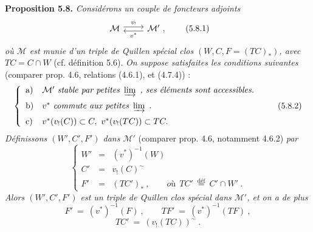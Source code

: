 \documentclass[11pt]{article}
\newcommand{\msp}[1]{\marginpar{\footnotesize [#1]}}
\newcommand{\defeq}{\overset{\text{déf}}{=}}
\newcommand{\cl}{^{\sim}}%
\begin{document}
\msp{page 91}
\textbf{Proposition 5.8.} \textit{Considérons un couple de foncteurs adjoints}
\[
\begin{tikzcd}
\mathcal{M} \arrow[r, shift left, "v_!"] & \mathcal{M}' \arrow[l, shift left, "v^*"] \ ,
\end{tikzcd}
\tag*{(5.8.1)}
\]
\textit{où $\mathcal{M}$ est munie d'un triple de Quillen spécial clos $(W, C, F = (TC)_*)$, avec $TC = C \cap W$} (cf. définition 5.6). \textit{On suppose satisfaites les conditions suivantes} (comparer prop. 4.6, relations (4.6.1), et (4.7.4)) :
\[
\left\{
\begin{array}{ll}
\text{a)} & \mathcal{M}' \ \textit{stable par petites}\ \varinjlim\ \textit{, ses éléments sont accessibles.}\\[1.5ex]
\text{b)} & v^* \ \textit{commute aux petites}\ \varinjlim\ .\\[1.5ex]
\text{c)} & v^*(v_!(C)) \subset C,\ v^*(v_!(TC)) \subset TC.
\end{array}
\right.
\tag*{(5.8.2)}
\]
\textit{Définissons $(W', C', F')$ dans $\mathcal{M}'$} (comparer prop. 4.6, notamment 4.6.2) \textit{par}
\[
\left\{
\begin{array}{lcl}
W' & = & (v^*)^{-1}(W)\\[1ex]
C' & = & v_!(C)\cl\\[1ex]
F' & = & (TC')_*\ , \qquad \textit{où}\ \ TC' \ \defeq \ C' \cap W'\ .
\end{array}
\right.
\tag*{(5.8.3)}
\]
\textit{Alors $(W', C', F')$ est un triple de Quillen clos spécial dans $\mathcal{M}'$, et on a de plus}
\[
F' \ = \ (v^*)^{-1}(F)\ , \qquad TF' \ = \ (v^*)^{-1}(TF)\ ,
\tag*{(5.8.4)}
\]
\[
TC' \ = \ (v_!(TC))\cl\ .
\tag*{(5.8.5)}
\]
\end{document}
